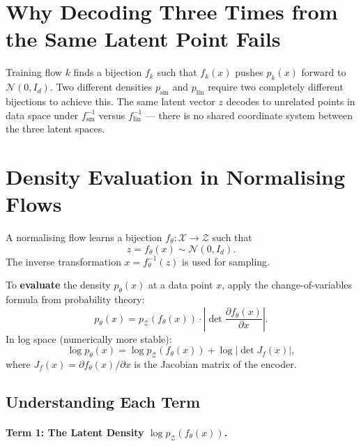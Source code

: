 \documentclass[11pt, a4paper]{article}
\begin{document}
\section{Why Decoding Three Times from the Same Latent Point Fails}

Training flow $k$ finds a bijection $f_k$ such that $f_k(x)$ pushes $p_k(x)$ forward
to $\mathcal{N}(0, I_d)$.
Two different densities $p_\mathrm{sm}$ and $p_\mathrm{lin}$ require two completely
different bijections to achieve this.
The same latent vector $z$ decodes to unrelated points in data space under
$f_\mathrm{sm}^{-1}$ versus $f_\mathrm{lin}^{-1}$ — there is no shared
coordinate system between the three latent spaces.

\section{Density Evaluation in Normalising Flows}

A normalising flow learns a bijection $f_\theta: \mathcal{X} \to \mathcal{Z}$ such that
\begin{equation}
    z = f_\theta(x) \sim \mathcal{N}(0, I_d).
\end{equation}
The inverse transformation $x = f_\theta^{-1}(z)$ is used for sampling.

To \textbf{evaluate} the density $p_\theta(x)$ at a data point $x$, apply the
change-of-variables formula from probability theory:
\begin{equation}
    p_\theta(x) = p_\mathcal{Z}(f_\theta(x)) \cdot \left|\det \frac{\partial f_\theta(x)}{\partial x}\right|.
    \label{eq:cov}
\end{equation}
In log space (numerically more stable):
\begin{equation}
    \log p_\theta(x) = \log p_\mathcal{Z}(f_\theta(x)) + \log\left|\det J_f(x)\right|,
    \label{eq:cov_log}
\end{equation}
where $J_f(x) = \partial f_\theta(x) / \partial x$ is the Jacobian matrix of the encoder.

\subsection{Understanding Each Term}

\paragraph{Term 1: The Latent Density $\log p_\mathcal{Z}(f_\theta(x))$.}
\end{document}
